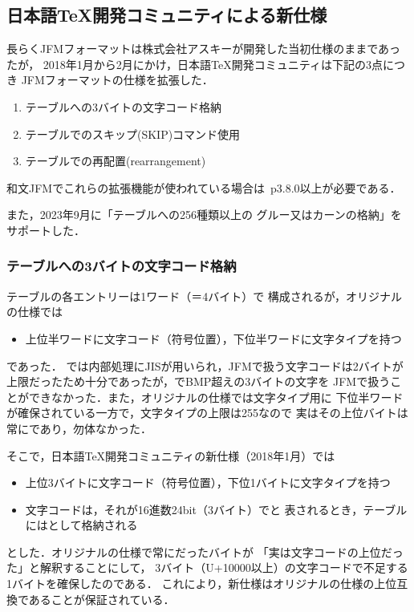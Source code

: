 \documentclass[a4paper,11pt,nomag]{jsarticle}
\begin{document}
\subsection{日本語\TeX{}開発コミュニティによる新仕様}\label{jfm-new}
長らくJFMフォーマットは株式会社アスキーが開発した当初仕様のままであったが，
2018年1月から2月にかけ，日本語\TeX{}開発コミュニティは下記の3点につき
JFMフォーマットの仕様を拡張した．
\begin{enumerate}
  \item {}テーブルへの3バイトの文字コード格納
  \item {}テーブルでのスキップ(SKIP)コマンド使用
  \item {}テーブルでの再配置(rearrangement)
\end{enumerate}
和文JFMでこれらの拡張機能が使われている場合は\pTeX~p3.8.0以上が必要である．

また，2023年9月に「テーブルへの256種類以上の
グルー又はカーンの格納」をサポートした．

\subsubsection{テーブルへの3バイトの文字コード格納}
テーブルの各エントリーは1ワード（＝4バイト）で
構成されるが，オリジナルの仕様では
\begin{itemize}
  \item 上位半ワードに文字コード（符号位置），下位半ワードに文字タイプを持つ
\end{itemize}
であった．
\pTeX{}では内部処理にJISが用いられ，JFMで扱う文字コードは2バイトが
上限だったため十分であったが，\upTeX{}でBMP超えの3バイトの文字を
JFMで扱うことができなかった．また，オリジナルの仕様では文字タイプ用に
下位半ワードが確保されている一方で，文字タイプの上限は255なので
実はその上位バイトは常にであり，勿体なかった．

そこで，日本語\TeX{}開発コミュニティの新仕様（2018年1月）では
\begin{itemize}
  \item 上位3バイトに文字コード（符号位置），下位1バイトに文字タイプを持つ
  \item 文字コードは，それが16進数24bit（3バイト）でと
    表されるとき，テーブルにはとして格納される
\end{itemize}
とした．オリジナルの仕様で常にだったバイトが
「実は文字コードの上位だった」と解釈することにして，
3バイト（U+10000以上）の文字コードで不足する1バイトを確保したのである．
これにより，新仕様はオリジナルの仕様の上位互換であることが保証されている．
\end{document}
